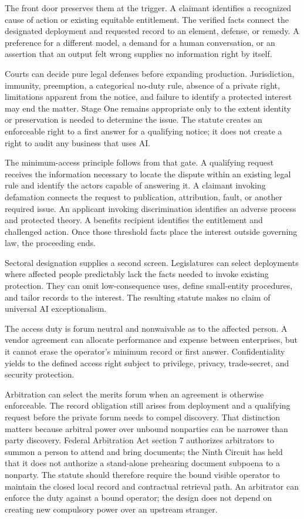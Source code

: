 The front door preserves them at the trigger. A claimant identifies a recognized cause of action or existing equitable entitlement. The verified facts connect the designated deployment and requested record to an element, defense, or remedy. A preference for a different model, a demand for a human conversation, or an assertion that an output felt wrong supplies no information right by itself.

Courts can decide pure legal defenses before expanding production. Jurisdiction, immunity, preemption, a categorical no-duty rule, absence of a private right, limitations apparent from the notice, and failure to identify a protected interest may end the matter. Stage One remains appropriate only to the extent identity or preservation is needed to determine the issue. The statute creates an enforceable right to a first answer for a qualifying notice; it does not create a right to audit any business that uses AI.

The minimum-access principle follows from that gate. A qualifying request receives the information necessary to locate the dispute within an existing legal rule and identify the actors capable of answering it. A claimant invoking defamation connects the request to publication, attribution, fault, or another required issue. An applicant invoking discrimination identifies an adverse process and protected theory. A benefits recipient identifies the entitlement and challenged action. Once those threshold facts place the interest outside governing law, the proceeding ends.

Sectoral designation supplies a second screen. Legislatures can select deployments where affected people predictably lack the facts needed to invoke existing protection. They can omit low-consequence uses, define small-entity procedures, and tailor records to the interest. The resulting statute makes no claim of universal AI exceptionalism.

The access duty is forum neutral and nonwaivable as to the affected person. A vendor agreement can allocate performance and expense between enterprises, but it cannot erase the operator's minimum record or first answer. Confidentiality yields to the defined access right subject to privilege, privacy, trade-secret, and security protection.

Arbitration can select the merits forum when an agreement is otherwise enforceable. The record obligation still arises from deployment and a qualifying request before the private forum needs to compel discovery. That distinction matters because arbitral power over unbound nonparties can be narrower than party discovery. Federal Arbitration Act section 7 authorizes arbitrators to summon a person to attend and bring documents; the Ninth Circuit has held that it does not authorize a stand-alone prehearing document subpoena to a nonparty. The statute should therefore require the bound visible operator to maintain the closed local record and contractual retrieval path. An arbitrator can enforce the duty against a bound operator; the design does not depend on creating new compulsory power over an upstream stranger.

